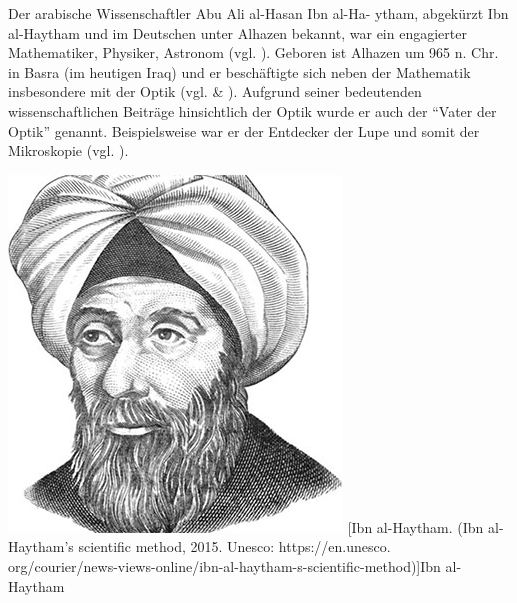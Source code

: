 \begin{minipage}{0.65\linewidth}
Der arabische Wissenschaftler Abu Ali al-Hasan Ibn al-Ha-
ytham, abgekürzt Ibn al-Haytham und im Deutschen unter
Alhazen bekannt, war ein engagierter Mathematiker,
Physiker, Astronom (vgl. \cite{rashed}). Geboren ist
Alhazen um 965 n. Chr. in Basra (im heutigen Iraq) und
er beschäftigte sich neben der Mathematik insbesondere 
mit der Optik (vgl. \cite{alhazen} \& \cite{oconnor_alhazen}).
Aufgrund seiner bedeutenden wissenschaftlichen Beiträge
hinsichtlich der Optik wurde er auch der ``Vater der Optik''
genannt. Beispielsweise war er der Entdecker der Lupe 
und somit der Mikroskopie (vgl. \cite{alhazen}).
\end{minipage}
\hfil
\begin{minipage}[r]{0.3\linewidth}
  \captionsetup{type=figure,font=small,skip=6pt,format=plain}%
  \capstart
  \includegraphics[width=1.0\linewidth]{./images/alhazen.jpg}
  [Ibn al-Haytham. (Ibn al-Haytham's scientific method, 2015. Unesco: https://en.unesco.\\
                org/courier/news-views-online/ibn-al-haytham-s-scientific-method)]{Ibn al-Haytham}
  \label{fig:portrait_alhazen}
\end{minipage}
\vspace{.3cm}

